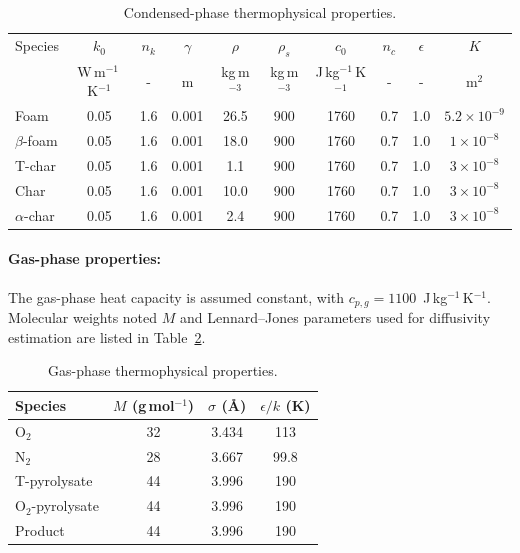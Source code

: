 \documentclass[12pt]{article}
\begin{document}
\begin{table}[h]
\centering
\caption{Condensed-phase thermophysical properties.}
\label{tab:solid properties smoldering}
\begin{tabular}{l c c c c c c c c c}
\hline
Species 
& $k_0$ & $n_k$ & $\gamma$ & $\rho$ & $\rho_s$ & $c_0$ & $n_c$ & $\epsilon$ & $K$ \\
& W\,m$^{-1}$\,K$^{-1}$ & - & m & kg\,m$^{-3}$ & kg\,m$^{-3}$ & J\,kg$^{-1}$\,K$^{-1}$ & - & - & m$^{2}$ \\
\hline
Foam & 0.05 & 1.6 & 0.001 & 26.5 & 900 & 1760 & 0.7 & 1.0 & $5.2\times10^{-9}$ \\
$\beta$-foam & 0.05 & 1.6 & 0.001 & 18.0 & 900 & 1760 & 0.7 & 1.0 & $1\times10^{-8}$ \\
T-char & 0.05 & 1.6 & 0.001 & 1.1 & 900 & 1760 & 0.7 & 1.0 & $3\times10^{-8}$ \\
Char & 0.05 & 1.6 & 0.001 & 10.0 & 900 & 1760 & 0.7 & 1.0 & $3\times10^{-8}$ \\
$\alpha$-char & 0.05 & 1.6 & 0.001 & 2.4 & 900 & 1760 & 0.7 & 1.0 & $3\times10^{-8}$ \\
\hline
\end{tabular}
\end{table}

\paragraph{Gas-phase properties:}

The gas-phase heat capacity is assumed constant, with $c_{p,g}=1100$~J\,kg$^{-1}$\,K$^{-1}$. Molecular weights noted $M$ and Lennard--Jones parameters used for diffusivity estimation are listed in Table~\ref{tab:gas properties smoldering}.

\begin{table}[h]
\centering
\caption{Gas-phase thermophysical properties.}
\label{tab:gas properties smoldering}
\begin{tabular}{l c c c}
\hline
Species & $M$ (g\,mol$^{-1}$) & $\sigma$ (\AA) & $\epsilon/k$ (K) \\
\hline
$\mathrm{O_2}$ & 32 & 3.434 & 113 \\
$\mathrm{N_2}$  & 28 & 3.667 & 99.8 \\
T-pyrolysate & 44 & 3.996 & 190 \\
$\mathrm{O_2}$-pyrolysate & 44 & 3.996 & 190 \\
Product & 44 & 3.996 & 190 \\
\hline
\end{tabular}
\end{table}
\end{document}
